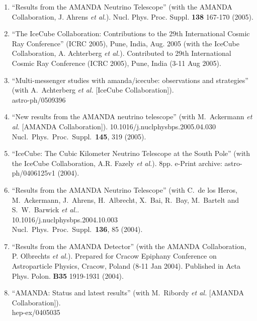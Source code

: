 \begin{enumerate}
\item ``Results from the AMANDA Neutrino Telescope'' (with
        the AMANDA   Collaboration, J. Ahrens {\it et al.}).
        Nucl. Phys. Proc. Suppl. {\bf     138} 167-170
        (2005).

\item ``The IceCube Collaboration: Contributions to the 29th
        International Cosmic Ray Conference'' (ICRC 2005),
        Pune, India,   Aug. 2005 (with the IceCube
        Collaboration, A. Achterberg {\it et al.}).
        Contributed to 29th International Cosmic Ray
        Conference (ICRC 2005),   Pune, India (3-11 Aug
        2005).

\item ``Multi-messenger studies with amanda/icecube:
        observations and   strategies'' (with A.~Achterberg
        {\it et al.}  [IceCube     Collaboration]).
        \\{}astro-ph/0509396 %

\item ``New results from the AMANDA neutrino telescope''
        (with M.~Ackermann   {\it et al.}  [AMANDA
        Collaboration]). 10.1016/j.nuclphysbps.2005.04.030
        \\{}Nucl.\ Phys.\ Proc.\ Suppl.\ {\bf 145}, 319
        (2005).

\item ``IceCube: The Cubic Kilometer Neutrino Telescope at
        the South   Pole'' (with the IceCube Collaboration,
        A.R. Fazely {\it et al.}).  8pp.   e-Print archive:
        astro-ph/0406125v1 (2004).

\item ``Results from the AMANDA Neutrino Telescope'' (with
        C.~de los Heros,   M.~Ackermann, J.~Ahrens,
        H.~Albrecht, X.~Bai, R.~Bay, M.~Bartelt and
        S.~W.~Barwick {\it et al.}.
        \\{}10.1016/j.nuclphysbps.2004.10.003   \\{}Nucl.\
        Phys.\ Proc.\ Suppl.\ {\bf 136}, 85 (2004).

\item ``Results from the AMANDA Detector'' (with the AMANDA
        Collaboration,   P. Olbrechts {\it et al.}).
        Prepared for Cracow Epiphany Conference on
        Astroparticle Physics, Cracow, Poland (8-11 Jan
        2004).  Published in   Acta Phys. Polon. {\bf B35}
        1919-1931 (2004).

\item ``AMANDA: Status and latest results'' (with M.~Ribordy
        {\it et al.}   [AMANDA Collaboration]).
        \\{}hep-ex/0405035 %


\end{enumerate}
